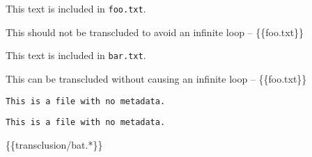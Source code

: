 This text is included in \texttt{foo.txt}.

This should not be transcluded to avoid an infinite loop -- \{\{foo.txt\}\}

This text is included in \texttt{bar.txt}.

This can be transcluded without causing an infinite loop -- \{\{foo.txt\}\}

\begin{verbatim}
This is a file with no metadata.
\end{verbatim}

\begin{verbatim}
This is a file with no metadata.
\end{verbatim}

\{\{transclusion\slash bat.*\}\}
